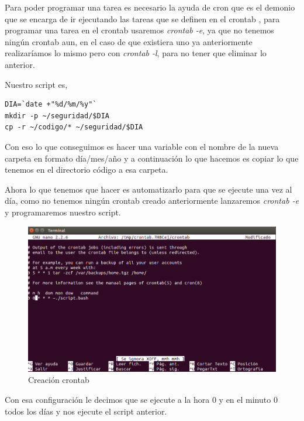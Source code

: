 Para poder programar una tarea es necesario la ayuda de cron  que es el demonio que se encarga de ir ejecutando las tareas que se definen en el crontab \cite{crontab}, para programar una tarea en el crontab usaremos \textit{crontab -e}, ya que no tenemos ningún crontab aun, en el caso de que existiera uno ya anteriormente realizaríamos lo mismo pero con \textit{crontab -l}, para no tener que eliminar lo anterior.

Nuestro script es,

\lstset{language=bash}

\begin{lstlisting}[frame=single]  
DIA=`date +"%d/%m/%y"`
mkdir -p ~/seguridad/$DIA
cp -r ~/codigo/* ~/seguridad/$DIA
\end{lstlisting}

Con eso lo que conseguimos es hacer una variable con el nombre de la nueva carpeta en formato día/mes/año y a continuación lo que hacemos es copiar lo que tenemos en el directorio código a esa carpeta.

Ahora lo que tenemos que hacer es automatizarlo para que se ejecute una vez al día, como no tenemos ningún crontab creado anteriormente lanzaremos \textit{crontab -e} y programaremos nuestro script.

\begin{figure}[H] %
	\centering
	\includegraphics[scale=0.5]{pics/crontab.png}  %
	\caption{Creación crontab} \label{fig:figura1}
\end{figure}

Con esa configuración le decimos que se ejecute a la hora 0 y en el minuto 0 todos los días y nos ejecute el script anterior.

